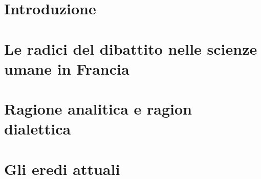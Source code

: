\documentclass[a4, 12pt, twoside,openany]{book}
\begin{document}
\tableofcontents %

\chapter*{Introduzione} %

\chapter{Le radici del dibattito nelle scienze umane in Francia}


\chapter{Ragione analitica e ragion dialettica}


\chapter{Gli eredi attuali}

%
\printbibliography %
\end{document}
